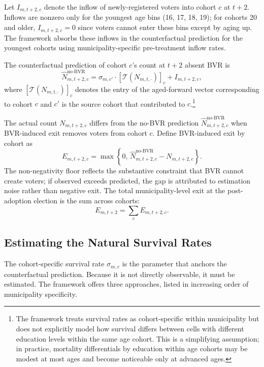 Let $I_{m,t+2,c}$ denote the inflow of newly-registered voters into cohort $c$ at $t+2$. Inflows are nonzero only for the youngest age bins (16, 17, 18, 19); for cohorts 20 and older, $I_{m,t+2,c} = 0$ since voters cannot enter these bins except by aging up. The framework absorbs these inflows in the counterfactual prediction for the youngest cohorts using municipality-specific pre-treatment inflow rates.

The counterfactual prediction of cohort $c$'s count at $t+2$ absent BVR is
\begin{equation}
\widehat{N}_{m,t+2,c}^{\text{no-BVR}} = \sigma_{m,c'} \cdot \left[\mathcal{T}(N_{m,t,\cdot})\right]_c + I_{m,t+2,c},
\label{eq:counterfactual}
\end{equation}
where $\left[\mathcal{T}(N_{m,t,\cdot})\right]_c$ denotes the entry of the aged-forward vector corresponding to cohort $c$ and $c'$ is the source cohort that contributed to $c$.\footnote{The framework treats survival rates as cohort-specific within municipality but does not explicitly model how survival differs between cells with different education levels within the same age cohort. This is a simplifying assumption; in practice, mortality differentials by education within age cohorts may be modest at most ages and become noticeable only at advanced ages.}

The actual count $N_{m,t+2,c}$ differs from the no-BVR prediction $\widehat{N}_{m,t+2,c}^{\text{no-BVR}}$ when BVR-induced exit removes voters from cohort $c$. Define BVR-induced exit by cohort as
\begin{equation}
E_{m,t+2,c} = \max\left\{0,\, \widehat{N}_{m,t+2,c}^{\text{no-BVR}} - N_{m,t+2,c}\right\}.
\label{eq:exit_cohort}
\end{equation}
The non-negativity floor reflects the substantive constraint that BVR cannot create voters; if observed exceeds predicted, the gap is attributed to estimation noise rather than negative exit. The total municipality-level exit at the post-adoption election is the sum across cohorts:
\begin{equation}
E_{m,t+2} = \sum_c E_{m,t+2,c}.
\label{eq:exit_total}
\end{equation}

\subsection{Estimating the Natural Survival Rates}
\label{ssec:decomposition_survival}

The cohort-specific survival rate $\sigma_{m,c}$ is the parameter that anchors the counterfactual prediction. Because it is not directly observable, it must be estimated. The framework offers three approaches, listed in increasing order of municipality specificity.

